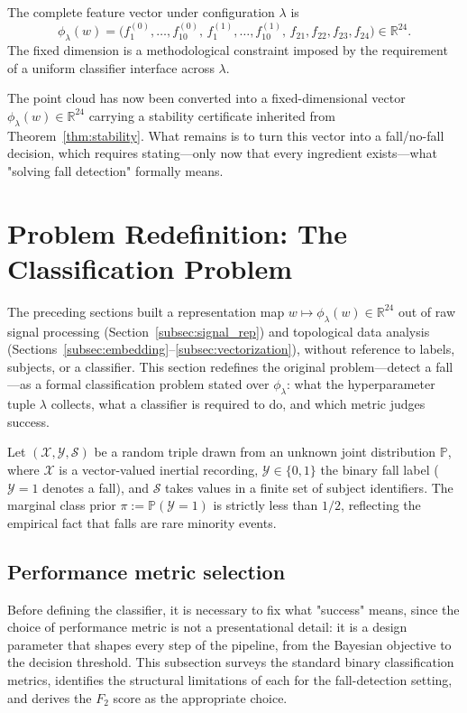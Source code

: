 \documentclass[onluarkali,ingilizce,yukseklisans,karton,LisansustuEgitim]{itutez}
\providecommand{\R}{\mathbb{R}}
\providecommand{\Prob}{\mathbb{P}}
\providecommand{\1}{\mathbf{1}}
\providecommand{\Sset}{\mathcal{S}}
\providecommand{\X}{\mathcal{X}}
\providecommand{\Y}{\mathcal{Y}}
\begin{document}
The complete feature vector under configuration $\lambda$ is
\begin{equation}
  \phi_\lambda(w)=\bigl(f_1^{(0)},\ldots,f_{10}^{(0)},\,f_1^{(1)},\ldots,f_{10}^{(1)},\,f_{21},f_{22},f_{23},f_{24}\bigr)\in\R^{24}.
  \label{eq:full-vec}
\end{equation}
The fixed dimension is a methodological constraint imposed by the requirement of a uniform classifier interface across $\lambda$.

The point cloud has now been converted into a fixed-dimensional vector $\phi_\lambda(w)\in\R^{24}$ carrying a stability certificate inherited from Theorem~\ref{thm:stability}. What remains is to turn this vector into a fall/no-fall decision, which requires stating---only now that every ingredient exists---what "solving fall detection" formally means.

\section{Problem Redefinition: The Classification Problem}
\label{subsec:formal}

The preceding sections built a representation map $w\mapsto\phi_\lambda(w)\in\R^{24}$ out of raw signal processing (Section~\ref{subsec:signal_rep}) and topological data analysis (Sections~\ref{subsec:embedding}--\ref{subsec:vectorization}), without reference to labels, subjects, or a classifier. This section redefines the original problem---detect a fall---as a formal classification problem stated over $\phi_\lambda$: what the hyperparameter tuple $\lambda$ collects, what a classifier is required to do, and which metric judges success.

Let $(\X,\Y,\Sset)$ be a random triple drawn from an unknown joint distribution $\Prob$, where $\X$ is a vector-valued inertial recording, $\Y\in\{0,1\}$ the binary fall label ($\Y=1$ denotes a fall), and $\Sset$ takes values in a finite set of subject identifiers. The marginal class prior $\pi:=\Prob(\Y=1)$ is strictly less than $1/2$, reflecting the empirical fact that falls are rare minority events.

\subsection{Performance metric selection}
\label{subsubsec:metric-selection}

Before defining the classifier, it is necessary to fix what "success" means, since the choice of performance metric is not a presentational detail: it is a design parameter that shapes every step of the pipeline, from the Bayesian objective to the decision threshold. This subsection surveys the standard binary classification metrics, identifies the structural limitations of each for the fall-detection setting, and derives the $F_2$ score as the appropriate choice.
\end{document}
